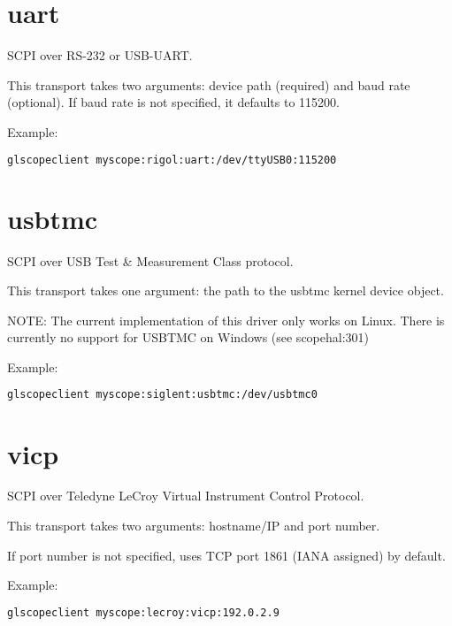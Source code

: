 \section{uart}

SCPI over RS-232 or USB-UART.

This transport takes two arguments: device path (required) and baud rate (optional). If baud rate is not specified, it
defaults to 115200.

Example:
\begin{lstlisting}[language=sh, numbers=none]
glscopeclient myscope:rigol:uart:/dev/ttyUSB0:115200
\end{lstlisting}

\section{usbtmc}

SCPI over USB Test \& Measurement Class protocol.

This transport takes one argument: the path to the usbtmc kernel device object.

NOTE: The current implementation of this driver only works on Linux. There is currently no support for USBTMC on
Windows (see scopehal:301)

Example:
\begin{lstlisting}[language=sh, numbers=none]
glscopeclient myscope:siglent:usbtmc:/dev/usbtmc0
\end{lstlisting}

\section{vicp}

SCPI over Teledyne LeCroy Virtual Instrument Control Protocol.

This transport takes two arguments: hostname/IP and port number.

If port number is not specified, uses TCP port 1861 (IANA assigned) by default.

Example:
\begin{lstlisting}[language=sh, numbers=none]
glscopeclient myscope:lecroy:vicp:192.0.2.9
\end{lstlisting}


